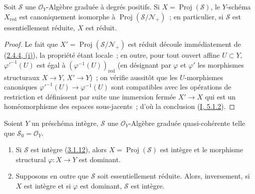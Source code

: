 \begin{proposition}[3.1.13]
\label{II.3.1.13-fr}
Soit $\mathcal{S}$ une $\mathcal{O}_Y$-Algèbre graduée à degrés positifs.
Si $X=\operatorname{Proj}(\mathcal{S})$, le $Y$-schéma $X_{\mathrm{red}}$ est
canoniquement isomorphe à $\operatorname{Proj}(\mathcal{S}/\mathcal{N}_+)$~;
en particulier, si $\mathcal{S}$ est essentiellement réduite, $X$ est réduit.
\end{proposition}

\begin{proof}
Le fait que $X'=\operatorname{Proj}(\mathcal{S}/\mathcal{N}_+)$ est réduit
découle immédiatement de (\hyperref[II.2.4.4-fr]{2.4.4, (i)}), la propriété
étant locale~; en outre, pour tout ouvert affine $U\subset Y$,
${\varphi'}^{-1}(U)$ est égal à $(\varphi^{-1}(U))_{\mathrm{red}}$ (en
désignant par $\varphi$ et $\varphi'$ les morphismes structuraux $X\to Y$,
$X'\to Y$)~; on vérifie aussitôt que les $U$-morphismes canoniques
${\varphi'}^{-1}(U)\to\varphi^{-1}(U)$ sont compatibles avec les opérations
de restriction et définissent par suite une immersion fermée $X'\to X$ qui
est un homéomorphisme des espaces sous-jacents~; d'où la conclusion
(\hyperref[I.5.1.2-fr]{I, 5.1.2}).
\end{proof}

\begin{proposition}[3.1.14]
\label{II.3.1.14-fr}
Soient $Y$ un préschéma intègre, $\mathcal{S}$ une
$\mathcal{O}_Y$-Algèbre graduée quasi-cohérente telle que
$\mathcal{S}_0=\mathcal{O}_Y$.
\begin{enumerate}
  \item[\rm(i)] Si $\mathcal{S}$ est intègre
    (\hyperref[II.3.1.12-fr]{3.1.12}), alors
    $X=\operatorname{Proj}(\mathcal{S})$ est intègre et le morphisme
    structural $\varphi:X\to Y$ est dominant.
  \item[\rm(ii)] Supposons en outre que $\mathcal{S}$ soit essentiellement
    réduite. Alors, inversement, si $X$ est intègre et si $\varphi$ est
    dominant, $\mathcal{S}$ est intègre.
\end{enumerate}
\end{proposition}

